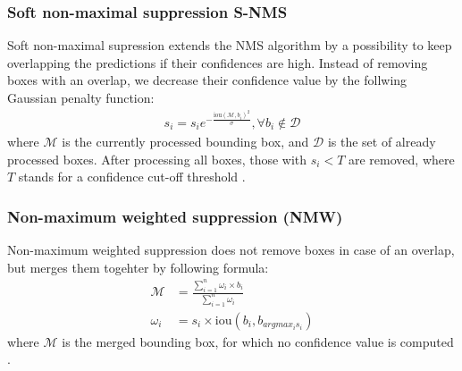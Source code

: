 \subsubsection{Soft non-maximal suppression {S-NMS}}
Soft non-maximal supression extends the NMS algorithm by a possibility to keep overlapping the predictions if their confidences are high. Instead of removing boxes with an overlap, we decrease their confidence value by the follwing Gaussian penalty function:
\begin{align}
    s_i = s_i e^{-\frac{\text{iou}\left( \mathcal{M}, b_i \right)^2}{\sigma}}, \forall b_i \notin \mathcal{D}
\end{align}
where $\mathcal{M}$ is the currently processed bounding box, and $\mathcal{D}$ is the set of already processed boxes. After processing all boxes, those with $s_i < T$ are removed, where $T$ stands  for a confidence cut-off threshold \cite{Bodla2017}.

\subsubsection{Non-maximum weighted suppression (NMW)}
Non-maximum weighted suppression does not remove boxes in case of an overlap, but merges them togehter by following formula:
\begin{align}
    \mathcal{M} & = \frac{\sum_{i=1}^n \omega_i \times b_i}{\sum_{i=1}^n \omega_i} \\
    \omega_i    & = s_i \times \text{iou} \left( b_i, b_{ argmax_i s_i} \right)
\end{align}
where $\mathcal{M}$ is the merged bounding box, for which no confidence value is computed \cite{Zhou2017,Solovyev2019}.

